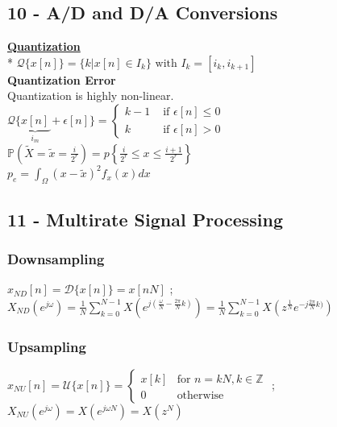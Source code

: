 \documentclass{article}
\newcommand{\para}[1]{\textbf{\underline{#1}}\\*} %
\newcommand{\subpara}[1]{\textbf{#1}}
\begin{document}
\subsection{10 - A/D and D/A Conversions} 
\begin{multicols}{2}
\para{Quantization}
$\mathscr Q \{x[n]\} = \{ k | x[n] \in I_k\} \text{ with } I_k = [i_k, i_{k+1}]$\\
\subpara{Quantization Error} \\
Quantization is highly non-linear.\\ 
$\mathscr Q \{ \underset{i_m}{\underbrace{x[n]}} + \epsilon[n] \} = \begin{cases}
k-1  & \text{ if } \epsilon[n] \leq 0 \\ 
k  & \text{ if } \epsilon[n] > 0 
\end{cases}$\\
$\mathbb P\left (\tilde X = \tilde x = \frac i {2^r}\right) = p\left \{  \frac i {2^r} \leq x \leq  \frac {i+1} {2^r} \right \}$\\
$p_e = \int_\Omega (x-\tilde x)^2 f_x(x) dx$

\end{multicols}

\subsection{11 - Multirate Signal Processing}
\begin{multicols}{2}
\subsubsection{Downsampling}
$x_{ND}[n] = \mathscr{D}\{x[n]\} = x[nN]$ ;\\ 
$\displaystyle X_{ND}(e^{j\omega}) = \frac1N\sum_{k=0}^{N-1}X(e^{j(\frac\omega N - \frac{2\pi}N k)}) = \frac1N\sum_{k=0}^{N-1}X(z^\frac1N e^{-j\frac{2\pi}N k)})$
\subsubsection{Upsampling}
$x_{NU}[n] = \mathscr{U}\{x[n]\} = \left \{ \begin{array}{ll}x[k]&\text{for } n=kN, k\in \mathbb{Z}\\ 0 & \text{otherwise} \end{array} \right.$ ;\\
$\displaystyle X_{NU}(e^{j\omega}) = X(e^{j\omega N}) = X(z^N)$
\end{multicols}
\end{document}
